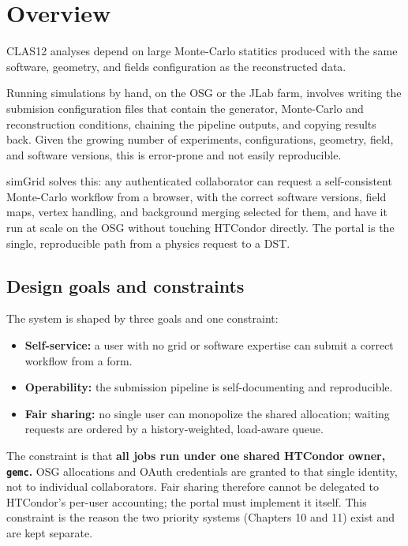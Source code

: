 \section{Overview}\label{ch:1}

CLAS12 analyses depend on large Monte-Carlo statitics produced with the same software, geometry, and fields
configuration as the reconstructed data.

Running simulations by hand, on the OSG or the JLab farm, involves writing the submision configuration files
that contain the generator, Monte-Carlo and reconstruction conditions, chaining the pipeline outputs,
and copying results back. Given the growing number of experiments, configurations, geometry, field, and software versions,
this is error-prone and not easily reproducible.

simGrid solves this: any authenticated collaborator can request a self-consistent Monte-Carlo workflow from a browser,
with the correct software versions, field maps, vertex handling, and background merging selected for them,
and have it run at scale on the OSG without touching HTCondor directly.
The portal is the single, reproducible path from a physics request to a DST.



\subsection{Design goals and constraints}

The system is shaped by three goals and one constraint:

\begin{itemize}
  \item \textbf{Self-service:} a user with no grid or software expertise can submit a correct workflow from a form.
  \item \textbf{Operability:} the submission pipeline is self-documenting and reproducible.
  \item \textbf{Fair sharing:} no single user can monopolize the shared allocation; waiting requests are
  ordered by a history-weighted, load-aware queue.
\end{itemize}

The constraint is that \textbf{all jobs run under one shared HTCondor owner, \texttt{gemc}.} OSG allocations
and OAuth credentials are granted to that single identity, not to individual collaborators. Fair sharing
therefore cannot be delegated to HTCondor's per-user accounting; the portal must implement it itself. This
constraint is the reason the two priority systems (Chapters 10 and 11) exist and are kept separate.

